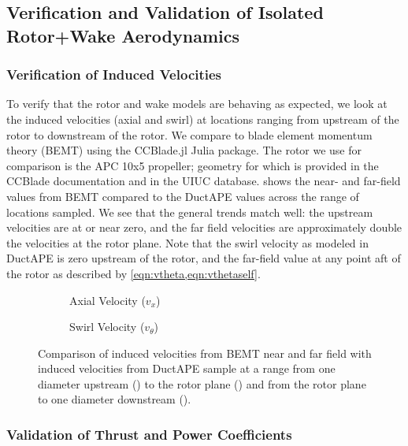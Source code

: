 \subsection{Verification and Validation of Isolated Rotor+Wake Aerodynamics}
\label{ssec:rwvv}

\subsubsection{Verification of Induced Velocities}

To verify that the rotor and wake models are behaving as expected, we look at the induced velocities (axial and swirl) at locations ranging from upstream of the rotor to downstream of the rotor.
%
We compare to blade element momentum theory (BEMT) using the CCBlade.jl Julia package.
%
The rotor we use for comparison is the APC 10x5 propeller; geometry for which is provided in the CCBlade documentation and in the UIUC database.
%
 shows the near- and far-field values from BEMT compared to the DuctAPE values across the range of locations sampled.
%
We see that the general trends match well: the upstream velocities are at or near zero, and the far field velocities are approximately double the velocities at the rotor plane.
%
Note that the swirl velocity as modeled in DuctAPE is zero upstream of the rotor, and the far-field value at any point aft of the rotor as described by \cref{eqn:vtheta,eqn:vthetaself}.


\begin{figure}[htb]
     \centering
     \begin{subfigure}[t]{0.45\textwidth}
        \centering
        \raisebox{-3em}{}
        \caption{Axial Velocity (\(v_x\))}
        \label{}
     \end{subfigure}
     \hfill
     \begin{subfigure}[t]{0.45\textwidth}
         \centering
        \raisebox{-3em}{}
        \caption{Swirl Velocity (\(v_\theta\))}
        \label{}
     \end{subfigure}
     \caption{Comparison of induced velocities from BEMT near and far field with induced velocities from DuctAPE sample at a range from one diameter upstream () to the rotor plane () and from the rotor plane to one diameter downstream ().}
    \label{fig:inducedvelcheck}
\end{figure}


\subsubsection{Validation of Thrust and Power Coefficients}

